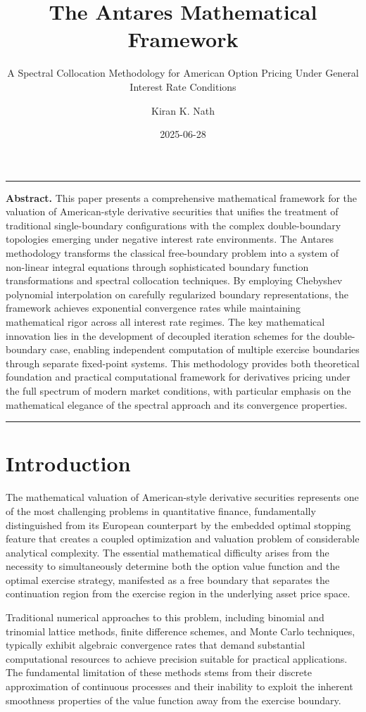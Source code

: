 \documentclass[
  american,
  11pt,
  11pt,
  letterpaper,
  onecolumn]{article}
\title{The Antares Mathematical Framework}
\subtitle{A Spectral Collocation Methodology for American Option Pricing
Under General Interest Rate Conditions}
\author{Kiran K. Nath}
\date{2025-06-28}
\renewenvironment{abstract}
  {\small\quotation\noindent\rule{\linewidth}{.5pt}\par\smallskip
   \noindent\textbf{Abstract.}\space}
  {\par\smallskip\noindent\rule{\linewidth}{.5pt}\endquotation}
\begin{document}
\maketitle
\begin{abstract}
This paper presents a comprehensive mathematical framework for the
valuation of American-style derivative securities that unifies the
treatment of traditional single-boundary configurations with the complex
double-boundary topologies emerging under negative interest rate
environments. The Antares methodology transforms the classical
free-boundary problem into a system of non-linear integral equations
through sophisticated boundary function transformations and spectral
collocation techniques. By employing Chebyshev polynomial interpolation
on carefully regularized boundary representations, the framework
achieves exponential convergence rates while maintaining mathematical
rigor across all interest rate regimes. The key mathematical innovation
lies in the development of decoupled iteration schemes for the
double-boundary case, enabling independent computation of multiple
exercise boundaries through separate fixed-point systems. This
methodology provides both theoretical foundation and practical
computational framework for derivatives pricing under the full spectrum
of modern market conditions, with particular emphasis on the
mathematical elegance of the spectral approach and its convergence
properties.
\end{abstract}


\section{Introduction}\label{introduction}

The mathematical valuation of American-style derivative securities
represents one of the most challenging problems in quantitative finance,
fundamentally distinguished from its European counterpart by the
embedded optimal stopping feature that creates a coupled optimization
and valuation problem of considerable analytical complexity. The
essential mathematical difficulty arises from the necessity to
simultaneously determine both the option value function and the optimal
exercise strategy, manifested as a free boundary that separates the
continuation region from the exercise region in the underlying asset
price space.

Traditional numerical approaches to this problem, including binomial and
trinomial lattice methods, finite difference schemes, and Monte Carlo
techniques, typically exhibit algebraic convergence rates that demand
substantial computational resources to achieve precision suitable for
practical applications. The fundamental limitation of these methods
stems from their discrete approximation of continuous processes and
their inability to exploit the inherent smoothness properties of the
value function away from the exercise boundary.
\end{document}
